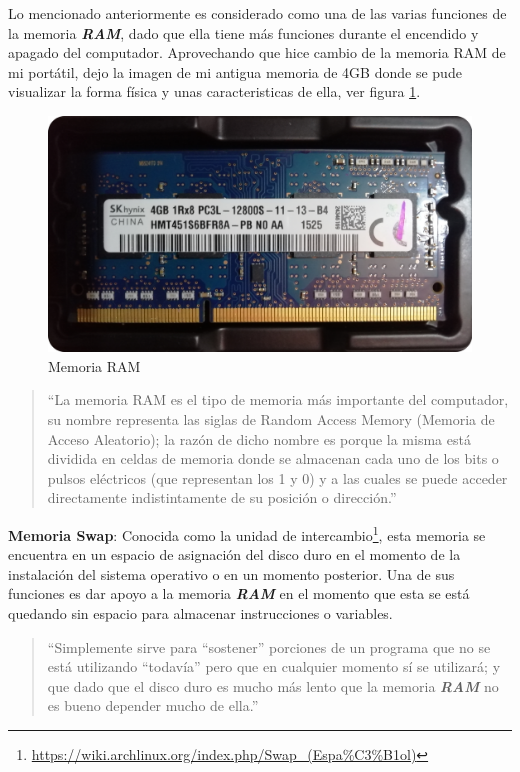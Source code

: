 \documentclass[12pt,letterpaper]{article}
\begin{document}
Lo mencionado anteriormente es considerado como una de las varias funciones de la memoria \textbf{\textit{RAM}}, dado que ella tiene más funciones durante el encendido y apagado del computador. Aprovechando que hice cambio de la memoria RAM de mi portátil, dejo la imagen de mi antigua memoria de 4GB donde se pude visualizar la forma física y unas caracteristicas de ella, ver figura \ref{F:RAM}.

\begin{figure}[H]
    \centering
    \includegraphics[angle=0,width=0.5\linewidth]{image/MemoriaRam.pdf}
    \caption{Memoria RAM}
    \label{F:RAM}
\end{figure}

\begin{quote}
    ``La memoria RAM es el tipo de memoria más importante del computador, su nombre representa las siglas de Random Access Memory (Memoria de Acceso Aleatorio); la razón de dicho nombre es porque la misma está dividida en celdas de memoria donde se almacenan cada uno de los bits o pulsos eléctricos (que representan los 1 y 0) y a las cuales se puede acceder directamente indistintamente de su posición o dirección.''\cite{GuiaProfesor}
\end{quote}



\textbf{Memoria Swap}: Conocida como la unidad de intercambio\footnote{\url{https://wiki.archlinux.org/index.php/Swap_(Espa\%C3\%B1ol)}}, esta memoria se encuentra en un espacio de asignación del disco duro en el momento de la instalación del sistema operativo o en un momento posterior. Una de sus funciones es dar apoyo a la memoria \textbf{\textit{RAM}} en el momento que  esta se está quedando sin espacio para almacenar instrucciones o variables.

\begin{quote}
    ``Simplemente sirve para ``sostener'' porciones de un programa que no se está utilizando ``todavía'' pero que en cualquier momento sí se utilizará; y que dado que el disco duro es mucho más lento que la memoria \textbf{\textit{RAM}} no es bueno depender mucho de ella.''\cite{GuiaProfesor}
\end{quote}
\end{document}
